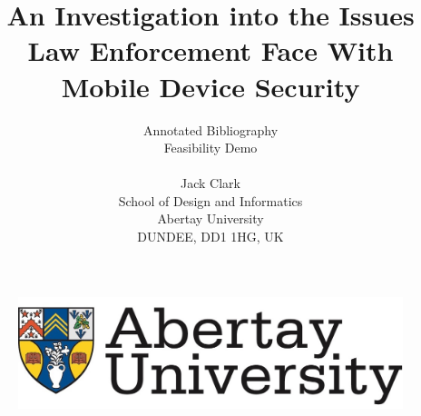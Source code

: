 \documentclass[11pt,a4paper]{article}
\title{An Investigation into the Issues Law Enforcement Face With Mobile Device Security}
\author{Annotated Bibliography\\Feasibility Demo\\ \\Jack Clark\\School of Design and Informatics\\Abertay University\\DUNDEE, DD1 1HG, UK}
\begin{document}

\begin{figure}
		\includegraphics[width=\linewidth]{Abertay}
\end{figure} 

\maketitle

\newpage 


\nocite{*}


\begin{flushleft}
	\printbibliography
\end{flushleft}
\end{document}
